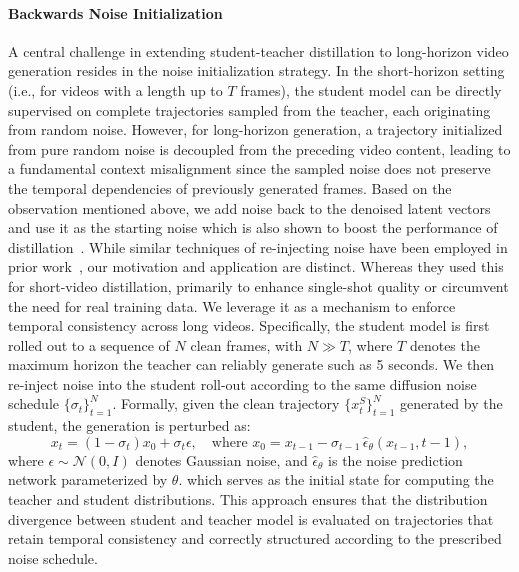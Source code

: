 \paragraph{Backwards Noise Initialization}
A central challenge in extending student-teacher distillation to long-horizon video generation resides in the noise initialization strategy. In the short-horizon setting (i.e., for videos with a length up to $T$ frames), the student model can be directly supervised on complete trajectories sampled from the teacher, each originating from random noise. However, for long-horizon generation, a trajectory initialized from pure random noise is decoupled from the preceding video content, leading to a fundamental context misalignment since the sampled noise does not preserve the temporal dependencies of previously generated frames.
 Based on the observation mentioned above, we add noise back to the denoised latent vectors and use it as the starting noise which is also shown to boost the performance of distillation~\citep{yin2024improved}. While similar techniques of re-injecting noise have been employed in prior work~\citep{yin2024improved,yin2025causvid,huang2025self}, our motivation and application are distinct. Whereas they used this for short-video distillation, primarily to enhance single-shot quality or circumvent the need for real training data. We leverage it as a mechanism to enforce temporal consistency across long videos.
 Specifically, the student model is first rolled out to a sequence of $N$ clean frames, with $N \gg T$, where $T$ denotes the maximum horizon the teacher can reliably generate such as 5 seconds. We then re-inject noise into the student roll-out according to the same diffusion noise schedule $\{\sigma_t\}_{t=1}^N$. Formally, given the clean trajectory $\{x_t^{S}\}_{t=1}^N$ generated by the student, the generation is perturbed as: 
\begin{equation}
\label{eq:perturbation}
x_t = (1-\sigma_t)x_{0} + \sigma_t \epsilon,
\quad \text{where } 
x_{0} = x_{t-1} - \sigma_{t-1}\,\hat{\epsilon}_{\theta}(x_{t-1}, t-1) ,
\end{equation} where $\epsilon \sim \mathcal{N}(0, I)$ denotes Gaussian noise,  
and $\hat{\epsilon}_{\theta}$ is the noise prediction network parameterized by $\theta$.
which serves as the initial state for computing the teacher and student distributions. This approach ensures that the distribution divergence between student and teacher model is evaluated on trajectories that retain temporal consistency and correctly structured according to the prescribed noise schedule.

